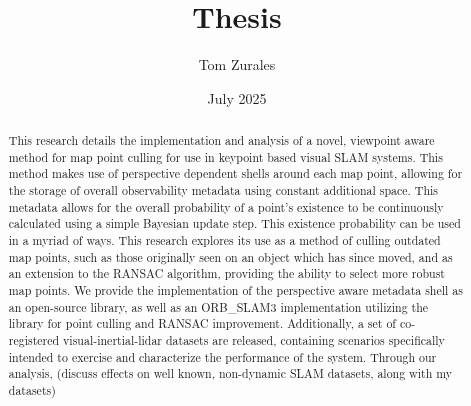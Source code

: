 \documentclass[12pt]{article}
\title{Thesis}
\author{Tom Zurales}
\date{July 2025}
\begin{document}
\doublespace

\maketitle

\newpage

\begin{abstract}
  This research details the implementation and analysis of a novel, viewpoint aware method for map point culling for use in keypoint based visual SLAM systems. This method makes use of perspective dependent shells around each map point, allowing for the storage of overall observability metadata using constant additional space. This metadata allows for the overall probability of a point's existence to be continuously calculated using a simple Bayesian update step. This existence probability can be used in a myriad of ways. This research explores its use as a method of culling outdated map points, such as those originally seen on an object which has since moved, and as an extension to the RANSAC algorithm, providing the ability to select more robust map points. We provide the implementation of the perspective aware metadata shell as an open-source library, as well as an ORB\_SLAM3 implementation utilizing the library for point culling and RANSAC improvement. Additionally, a set of co-registered visual-inertial-lidar datasets are released, containing scenarios specifically intended to exercise and characterize the performance of the system. Through our analysis, (discuss effects on well known, non-dynamic SLAM datasets, along with my datasets)
\end{abstract}

\newpage

\tableofcontents

\newpage

\listoffigures















\printbibliography


\end{document}
